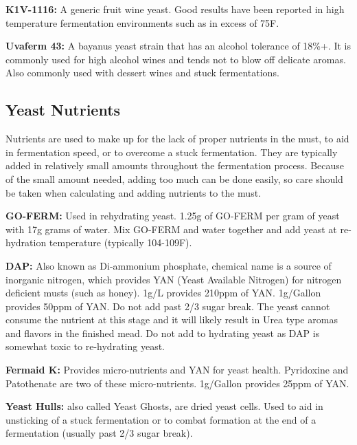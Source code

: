   \textbf{K1V-1116:} A generic fruit wine yeast. Good results have been reported in high temperature fermentation 
   environments such as in excess of 75\textdegree F.

  \textbf{Uvaferm 43:} A bayanus yeast strain that has an alcohol tolerance of 18\%+. It is commonly used for 
   high alcohol wines and tends not to blow off delicate aromas. Also commonly used with dessert wines and stuck 
   fermentations. 


 \subsection{Yeast Nutrients}
  Nutrients are used to make up for the lack of proper nutrients in the must, to aid in fermentation speed, or 
  to overcome a stuck fermentation. They are typically added in relatively small amounts throughout the fermentation
  process. Because of the small amount needed, adding too much can be done easily, so care should be taken when 
  calculating and adding nutrients to the must.

  \textbf{GO-FERM:} Used in rehydrating yeast. 1.25g of GO-FERM per gram of yeast with 17g grams of water. 
   Mix GO-FERM and water together and add yeast at re-hydration temperature (typically 104-109F). 

  \textbf{DAP:} Also known as Di-ammonium phosphate, chemical name  is a source of inorganic 
   nitrogen, which provides YAN (Yeast Available Nitrogen) for nitrogen deficient musts (such as honey). 
   1g/L provides 210ppm of YAN. 1g/Gallon provides 50ppm of YAN.  Do not add past 2/3 sugar break. 
   The yeast cannot consume the nutrient at this stage and it will likely result in Urea type aromas and 
   flavors in the finished mead. Do not add to hydrating yeast as DAP is somewhat toxic to re-hydrating yeast.

  \textbf{Fermaid K:} Provides micro-nutrients and YAN for yeast health. Pyridoxine and Patothenate are two of 
   these micro-nutrients. 1g/Gallon provides 25ppm of YAN.


  \textbf{Yeast Hulls:} also called Yeast Ghosts, are dried yeast cells. Used to aid in unsticking of a stuck 
   fermentation or to combat  formation at the end of a fermentation (usually past 2/3 sugar break).
  
